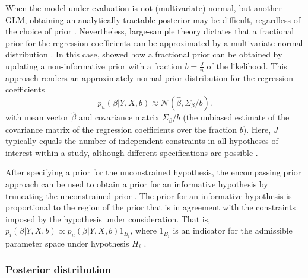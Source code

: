\documentclass[
  authoryear,
  preprint,
  5p,
  twocolumn]{elsarticle}
\begin{document}
When the model under evaluation is not (multivariate) normal, but
another GLM, obtaining an analytically tractable posterior may be
difficult, regardless of the choice of prior \citep{bda2013}.
Nevertheless, large-sample theory dictates that a fractional prior for
the regression coefficients can be approximated by a multivariate normal
distribution \citep{bda2013}. In this case, \citet{gu_approximated_2018}
showed how a fractional prior can be obtained by updating a
non-informative prior with a fraction \(b = \frac{J}{n}\) of the
likelihood. This approach renders an approximately normal prior
distribution for the regression coefficients \[
p_u(\beta | Y, X, b) \approx \mathcal{N}(\hat{\beta}, \Sigma_\beta / b).
\] with mean vector \(\hat{\beta}\) and covariance matrix
\(\Sigma_{\beta}/b\) (the unbiased estimate of the covariance matrix of
the regression coefficients over the fraction \(b\)). Here, \(J\)
typically equals the number of independent constraints in all hypotheses
of interest within a study, although different specifications are
possible \citep[for an elaborate discussion on appropriate values for
\(J\), see][]{gu_approximated_2018, hoijtink_prior_2021}.

After specifying a prior for the unconstrained hypothesis, the
encompassing prior approach can be used to obtain a prior for an
informative hypothesis by truncating the unconstrained prior
\citep[e.g.,][]{klugkist_inequality_2005, mulder_equality_2010, mulder_prior_2014}.
The prior for an informative hypothesis is proportional to the region of
the prior that is in agreement with the constraints imposed by the
hypothesis under consideration. That is,
\(p_i(\beta | Y, X, b) \propto p_u(\beta | Y, X, b)1_{B_i}\), where
\(1_{B_i}\) is an indicator for the admissible parameter space under
hypothesis \(H_i\) \citep{gu_approximated_2018}.

\hypertarget{posterior-distribution}{%
\subsubsection{Posterior distribution}\label{posterior-distribution}}
\end{document}

